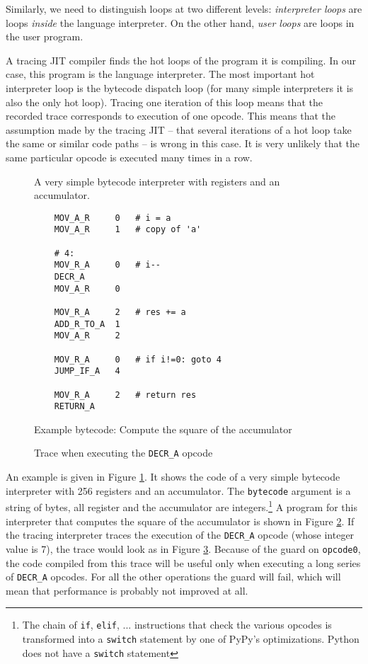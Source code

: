 \documentclass{sig-alternate}
\begin{document}
Similarly, we need to distinguish loops at two different levels:
\emph{interpreter loops} are loops \emph{inside} the language interpreter. On
the other hand, \emph{user loops} are loops in the user program.

A tracing JIT compiler finds the hot loops of the program it is compiling. In
our case, this program is the language interpreter. The most important hot interpreter loop
is the bytecode dispatch loop (for many simple
interpreters it is also the only hot loop).  Tracing one iteration of this
loop means that
the recorded trace corresponds to execution of one opcode. This means that the
assumption made by the tracing JIT -- that several iterations of a hot loop
take the same or similar code paths -- is wrong in this case. It is very
unlikely that the same particular opcode is executed many times in a row.
\begin{figure}

\caption{A very simple bytecode interpreter with registers and an accumulator.}
\label{fig:tlr-basic}
\end{figure}
\begin{figure}
{\small
\begin{verbatim}
    MOV_A_R     0   # i = a
    MOV_A_R     1   # copy of 'a'
    
    # 4:
    MOV_R_A     0   # i--
    DECR_A
    MOV_A_R     0    

    MOV_R_A     2   # res += a
    ADD_R_TO_A  1
    MOV_A_R     2
    
    MOV_R_A     0   # if i!=0: goto 4
    JUMP_IF_A   4

    MOV_R_A     2   # return res
    RETURN_A
\end{verbatim}
}
\caption{Example bytecode: Compute the square of the accumulator}
\label{fig:square}
\end{figure}

\begin{figure}

\caption{Trace when executing the \texttt{DECR\_A} opcode}
\label{fig:trace-normal}
\end{figure}

An example is given in Figure \ref{fig:tlr-basic}. It shows the code of a very
simple bytecode interpreter with 256 registers and an accumulator.  The
\texttt{bytecode} argument is a string of bytes, all register and the
accumulator are integers.\footnote{The
chain of \texttt{if}, \texttt{elif}, ... instructions that check the various
opcodes is transformed into a \texttt{switch} statement by one of PyPy's
optimizations. Python does not have a \texttt{switch} statement}
A program for this interpreter that computes
the square of the accumulator is shown in Figure \ref{fig:square}. If the
tracing interpreter traces the execution of the \texttt{DECR\_A} opcode (whose
integer value is 7), the trace would look as in Figure \ref{fig:trace-normal}.
Because of the guard on \texttt{opcode0}, the code compiled from this trace will
be useful only when executing a long series of \texttt{DECR\_A} opcodes. For all
the other operations the guard will fail, which will mean that performance is
probably not improved at all.
\end{document}
